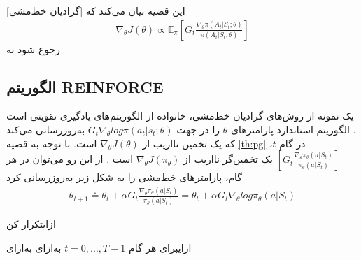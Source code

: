 [گرادیان خط‌مشی] این قضیه بیان می‌کند که
\begin{align}
	\nabla_\theta J(\theta) \propto \mathbb{E}_\pi \left[ G_t \frac{\nabla_\theta \pi (A_t|S_t; \theta)}{\pi(A_t|S_t; \theta)} \right]
	\label{eq:pg}
\end{align}
رجوع شود به 
\cite{suttonbook}

\subsection{الگوریتم REINFORCE}

یک نمونه از روش‌های گرادیان خط‌مشی، خانواده
از الگوریتم‌های یادگیری تقویتی است
\cite{williams1992simple}.
الگوریتم استاندارد  پارامترهای $\theta$ را در جهت 
$G_t \nabla_\theta  log  \pi (a_t|s_t;\theta)$
 به‌روزرسانی می‌کند که یک تخمین نااریب از
$\nabla_\theta J(\theta)$
است.
با توجه به قضیه 
\ref{th:pg}
در گام $t$،
$\left[ G_t \frac{\nabla_\theta \pi_\theta (a|S_t)}{\pi_\theta (a|S_t)} \right]$
یک تخمین‌گر نااریب از $\nabla_\theta J(\pi_\theta)$ است \cite{suttonbook}. از این رو می‌توان در هر گام، پارامترهای خط‌مشی
 را به شکل زیر به‌روزرسانی کرد
\begin{align}
\theta_{t+1} \doteq \theta_t + \alpha G_t \frac{\nabla_\theta \pi_\theta (a|S_t)}{\pi_\theta (a|S_t)} = \theta_t + \alpha G_t \nabla_\theta log \pi_\theta (a|S_t)
\label{def:updaterule}
\end{align}



‌ازای{تکرار کن}

‌ازای{برای هر گام
$t=0,...,T-1$}
‌به‌ازای
‌به‌ازای

